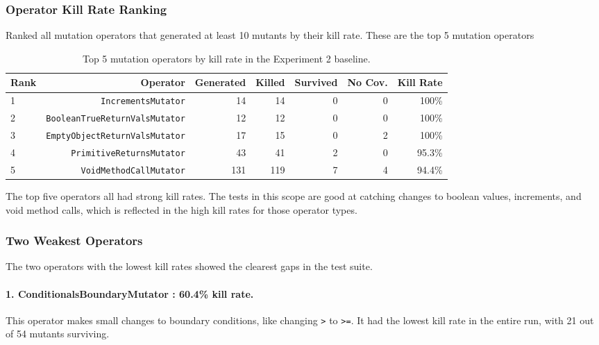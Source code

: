 \documentclass[11pt]{article}
\begin{document}
\subsubsection{Operator Kill Rate Ranking}

Ranked all mutation operators that generated at least 10 mutants by their kill rate. These are the top 5 mutation operators

\begin{table}[H]
\centering
\small
\begin{tabular}{lrrrrrr}
\toprule
Rank & Operator & Generated & Killed & Survived & No Cov. & Kill Rate \\
\midrule
1 & \texttt{IncrementsMutator} & 14 & 14 & 0 & 0 & 100\% \\
2 & \texttt{BooleanTrueReturnValsMutator} & 12 & 12 & 0 & 0 & 100\% \\
3 & \texttt{EmptyObjectReturnValsMutator} & 17 & 15 & 0 & 2 & 100\% \\
4 & \texttt{PrimitiveReturnsMutator} & 43 & 41 & 2 & 0 & 95.3\% \\
5 & \texttt{VoidMethodCallMutator} & 131 & 119 & 7 & 4 & 94.4\% \\
\bottomrule
\end{tabular}
\caption{Top 5 mutation operators by kill rate in the Experiment 2 baseline.}
\end{table}

The top five operators all had strong kill rates. The tests in this scope are good at catching changes to boolean values, increments, and void method calls, which is reflected in the high kill rates for those operator types.

\subsubsection{Two Weakest Operators}

The two operators with the lowest kill rates showed the clearest gaps in the test suite.

\paragraph{1. ConditionalsBoundaryMutator : 60.4\% kill rate.}

This operator makes small changes to boundary conditions, like changing \texttt{>} to \texttt{>=}. It had the lowest kill rate in the entire run, with 21 out of 54 mutants surviving.
\end{document}
